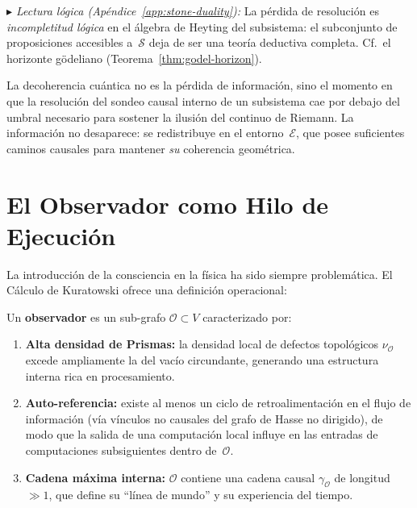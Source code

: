 \documentclass[11pt, a4paper, openany]{book}
\newcommand{\stoneref}[1]{%
  \smallskip\noindent
  {\small\color{structure!70}\textit{$\blacktriangleright$ Lectura
  l\'ogica (Ap\'endice~\ref{app:stone-duality}):} #1}%
  \smallskip}
\begin{document}
\stoneref{La p\'erdida de resoluci\'on es
\emph{incompletitud l\'ogica} en el \'algebra de Heyting del
subsistema: el subconjunto de proposiciones accesibles
a~$\mathcal{S}$ deja de ser una teor\'ia deductiva completa.
Cf.~el horizonte g\"odeliano
(Teorema~\ref{thm:godel-horizon}).}

\begin{result}[title={La Decoherencia como Fen\'omeno Topol\'ogico}]
\label{res:decoherence}
La decoherencia cu\'antica no es la p\'erdida de informaci\'on, sino
el momento en que la resoluci\'on del sondeo causal interno de un
subsistema cae por debajo del umbral necesario para sostener la
ilusi\'on del continuo de Riemann. La informaci\'on no desaparece:
se redistribuye en el entorno~$\mathcal{E}$, que posee
suficientes caminos causales para mantener \emph{su} coherencia
geom\'etrica.
\end{result}

\section*{El Observador como Hilo de Ejecuci\'on}

La introducci\'on de la consciencia en la f\'isica ha sido siempre
problem\'atica. El C\'alculo de Kuratowski ofrece una definici\'on
operacional:

\begin{definition}
\label{def:observer}
Un \textbf{observador} es un sub-grafo $\mathcal{O} \subset V$
caracterizado por:
\begin{enumerate}
  \item \textbf{Alta densidad de Prismas:} la densidad local de
    defectos topol\'ogicos $\nu_{\mathcal{O}}$ excede ampliamente la
    del vac\'io circundante, generando una estructura interna rica en
    procesamiento.
  \item \textbf{Auto-referencia:} existe al menos un ciclo de
    retroalimentaci\'on en el flujo de informaci\'on (v\'ia
    v\'inculos no causales del grafo de Hasse no dirigido), de modo
    que la salida de una computaci\'on local influye en las entradas
    de computaciones subsiguientes dentro de~$\mathcal{O}$.
  \item \textbf{Cadena m\'axima interna:} $\mathcal{O}$ contiene una
    cadena causal $\gamma_\mathcal{O}$ de longitud $\gg 1$, que
    define su ``l\'inea de mundo'' y su experiencia del tiempo.
\end{enumerate}
\end{definition}
\end{document}
